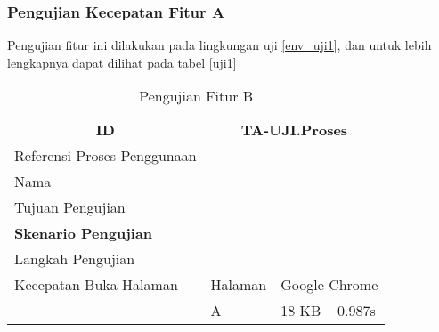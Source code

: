       \subsubsection{Pengujian Kecepatan Fitur A}
      Pengujian fitur ini dilakukan pada lingkungan uji \ref{env_uji1}, dan untuk lebih lengkapnya dapat dilihat pada tabel \ref{uji1}
      \begin{table}[]
      \centering
      \caption{Pengujian Fitur B}
      \label{uji2}
      \begin{tabular}{llll}
      \multicolumn{1}{c}{\textbf{ID}} & \multicolumn{3}{c}{\textbf{TA-UJI.Proses}}        \\
      Referensi Proses Penggunaan     & \multicolumn{3}{l}{}                              \\
      Nama                            & \multicolumn{3}{l}{}                              \\
      Tujuan Pengujian                & \multicolumn{3}{l}{\multirow{2}{*}{}}             \\
      \textbf{Skenario Pengujian}     & \multicolumn{3}{l}{}                              \\
      Langkah Pengujian               & \multicolumn{3}{l}{}                              \\
      Kecepatan Buka Halaman          & Halaman       & \multicolumn{2}{l}{Google Chrome} \\
                                      & A             & 18 KB           & 0.987s         
      \end{tabular}
      \end{table}
      